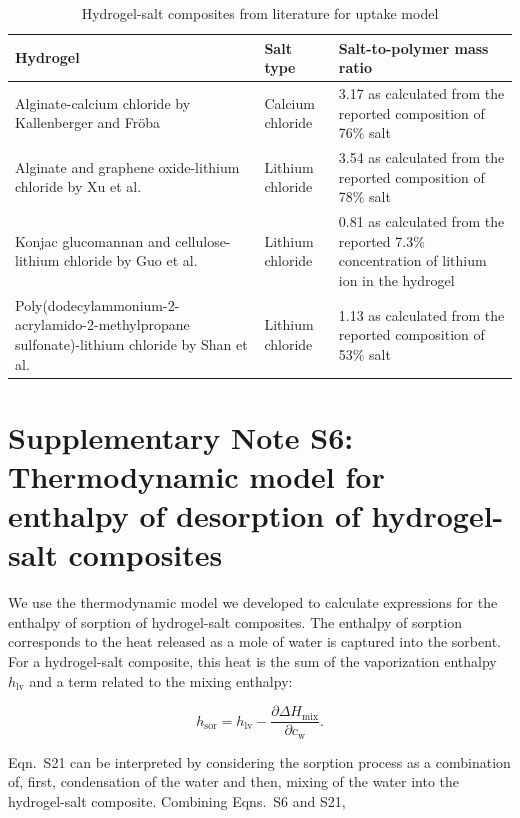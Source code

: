 \documentclass[11pt]{article}
\begin{document}
\begin{table}[htbp]
\centering
\caption{Hydrogel-salt composites from literature for uptake model}
\label{tab:S2}
\small
\begin{tabular}{@{}p{5.2cm}p{2.3cm}p{7cm}@{}}
\toprule
Hydrogel & Salt type & Salt-to-polymer mass ratio \\
\midrule
Alginate-calcium chloride by Kallenberger and Fr\"oba\cite{kallenberger2018} & Calcium chloride & 3.17 as calculated from the reported composition of 76\% salt \\
Alginate and graphene oxide-lithium chloride by Xu et al.\cite{xu2021} & Lithium chloride & 3.54 as calculated from the reported composition of 78\% salt \\
Konjac glucomannan and cellulose-lithium chloride by Guo et al.\cite{guo2022} & Lithium chloride & 0.81 as calculated from the reported 7.3\% concentration of lithium ion in the hydrogel \\
Poly(dodecylammonium-2-acrylamido-2-methylpropane sulfonate)-lithium chloride by Shan et al.\cite{shan2023} & Lithium chloride & 1.13 as calculated from the reported composition of 53\% salt \\
\bottomrule
\end{tabular}
\end{table}

\clearpage

\section*{Supplementary Note S6: Thermodynamic model for enthalpy of desorption of hydrogel-salt composites}

We use the thermodynamic model we developed to calculate expressions for the enthalpy of sorption of hydrogel-salt composites. The enthalpy of sorption corresponds to the heat released as a mole of water is captured into the sorbent. For a hydrogel-salt composite, this heat is the sum of the vaporization enthalpy $h_\mathrm{lv}$ and a term related to the mixing enthalpy:

\begin{equation}
h_\mathrm{sor} = h_\mathrm{lv} - \frac{\partial \Delta H_\mathrm{mix}}{\partial c_\mathrm{w}}. \tag{S21}
\end{equation}

Eqn.~S21 can be interpreted by considering the sorption process as a combination of, first, condensation of the water and then, mixing of the water into the hydrogel-salt composite. Combining Eqns.~S6 and S21,
\end{document}
